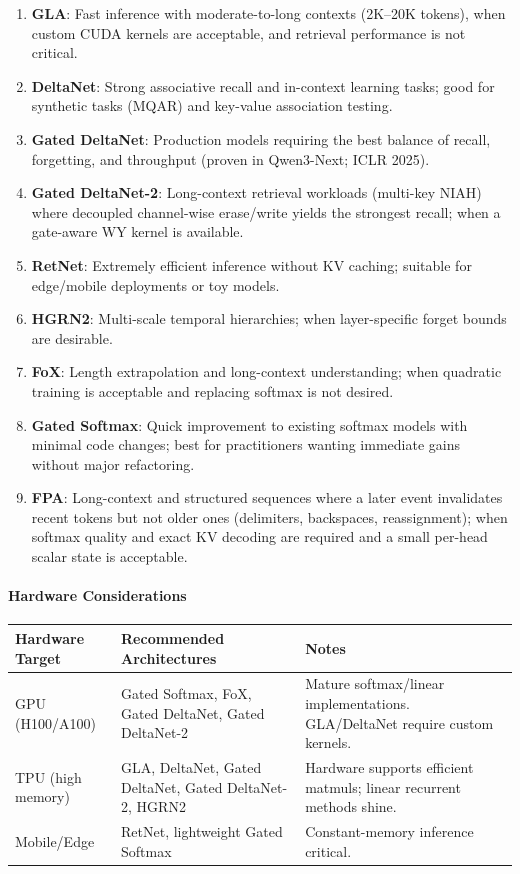 \begin{enumerate}[leftmargin=*]
    \item \textbf{GLA}: Fast inference with moderate-to-long contexts (2K--20K tokens), when custom CUDA kernels are acceptable, and retrieval performance is not critical.
    \item \textbf{DeltaNet}: Strong associative recall and in-context learning tasks; good for synthetic tasks (MQAR) and key-value association testing.
    \item \textbf{Gated DeltaNet}: Production models requiring the best balance of recall, forgetting, and throughput (proven in Qwen3-Next; ICLR 2025).
    \item \textbf{Gated DeltaNet-2}: Long-context retrieval workloads (multi-key NIAH) where decoupled channel-wise erase/write yields the strongest recall; when a gate-aware WY kernel is available.
    \item \textbf{RetNet}: Extremely efficient inference without KV caching; suitable for edge/mobile deployments or toy models.
    \item \textbf{HGRN2}: Multi-scale temporal hierarchies; when layer-specific forget bounds are desirable.
    \item \textbf{FoX}: Length extrapolation and long-context understanding; when quadratic training is acceptable and replacing softmax is not desired.
    \item \textbf{Gated Softmax}: Quick improvement to existing softmax models with minimal code changes; best for practitioners wanting immediate gains without major refactoring.
    \item \textbf{FPA}: Long-context and structured sequences where a later event invalidates recent tokens but not older ones (delimiters, backspaces, reassignment); when softmax quality and exact KV decoding are required and a small per-head scalar state is acceptable.
\end{enumerate}

\paragraph{Hardware Considerations}

\begin{table}[H]
\centering
\small
\begin{tabularx}{0.95\linewidth}{Xp{3.5cm}p{3.5cm}}
\toprule
\textbf{Hardware Target} & \textbf{Recommended Architectures} & \textbf{Notes} \\
\midrule
GPU (H100/A100) & Gated Softmax, FoX, Gated DeltaNet, Gated DeltaNet-2 & Mature softmax/linear implementations. GLA/DeltaNet require custom kernels. \\
TPU (high memory) & GLA, DeltaNet, Gated DeltaNet, Gated DeltaNet-2, HGRN2 & Hardware supports efficient matmuls; linear recurrent methods shine. \\
Mobile/Edge & RetNet, lightweight Gated Softmax & Constant-memory inference critical. \\
\bottomrule
\end{tabularx}
\end{table}


